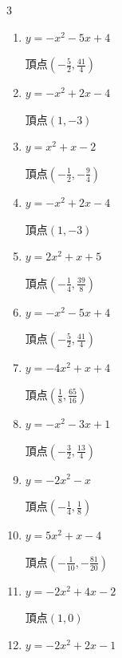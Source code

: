 \begin{multicols}{3}
\begin{enumerate}
  \item $\displaystyle y=-x^{2}-5x+4$

        $\displaystyle 頂点\left( -\frac{5}{2} , \frac{41}{4} \right)$

  \item $\displaystyle y=-x^{2}+2x-4$

        $\displaystyle 頂点\left( 1 , -3 \right)$

\columnbreak %

  \item $\displaystyle y=x^{2}+x-2$

        $\displaystyle 頂点\left( -\frac{1}{2} , -\frac{9}{4} \right)$

  \item $\displaystyle y=-x^{2}+2x-4$

        $\displaystyle 頂点\left( 1 , -3 \right)$

  \item $\displaystyle y=2x^{2}+x+5$

        $\displaystyle 頂点\left( -\frac{1}{4} , \frac{39}{8} \right)$

  \item $\displaystyle y=-x^{2}-5x+4$

        $\displaystyle 頂点\left( -\frac{5}{2} , \frac{41}{4} \right)$

  \item $\displaystyle y=-4x^{2}+x+4$

        $\displaystyle 頂点\left( \frac{1}{8} , \frac{65}{16} \right)$

\columnbreak %

  \item $\displaystyle y=-x^{2}-3x+1$

        $\displaystyle 頂点\left( -\frac{3}{2} , \frac{13}{4} \right)$

  \item $\displaystyle y=-2x^{2}-x$

        $\displaystyle 頂点\left( -\frac{1}{4} , \frac{1}{8} \right)$

  \item $\displaystyle y=5x^{2}+x-4$

        $\displaystyle 頂点\left( -\frac{1}{10} , -\frac{81}{20} \right)$

  \item $\displaystyle y=-2x^{2}+4x-2$

        $\displaystyle 頂点\left( 1 , 0 \right)$

  \item $\displaystyle y=-2x^{2}+2x-1$


\end{enumerate}
\end{multicols}
